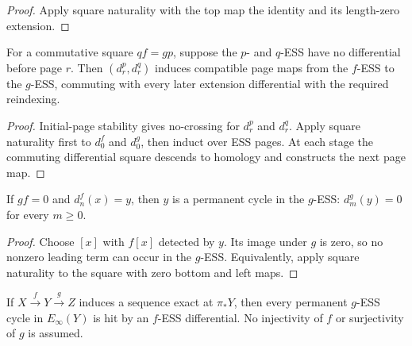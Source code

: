 \begin{proof}
  Apply square naturality with the top map the identity and its length-zero
  extension.
\end{proof}

\begin{corollary}
  \label{cor:fess-map-of-stable-pages}
  \notready
  For a commutative square $qf=gp$, suppose the $p$- and $q$-ESS have no
  differential before page $r$.  Then $(d_r^p,d_r^q)$ induces compatible page
  maps from the $f$-ESS to the $g$-ESS, commuting with every later extension
  differential with the required reindexing.
\end{corollary}

\begin{proof}
  Initial-page stability gives no-crossing for $d_r^p$ and $d_r^q$.  Apply
  square naturality first to $d_0^f$ and $d_0^g$, then induct over ESS pages.
  At each stage the commuting differential square descends to homology and
  constructs the next page map.
\end{proof}

\begin{corollary}
  \label{cor:fess-zero-composite-permanent}
  \notready
  If $gf=0$ and $d_n^f(x)=y$, then $y$ is a permanent cycle in the $g$-ESS:
  $d_m^g(y)=0$ for every $m\ge0$.
\end{corollary}

\begin{proof}
  Choose $[x]$ with $f[x]$ detected by $y$.  Its image under $g$ is zero, so
  no nonzero leading term can occur in the $g$-ESS.  Equivalently, apply square
  naturality to the square with zero bottom and left maps.
\end{proof}

\begin{proposition}
  \label{prop:fess-exact-middle-boundary}
  \notready
  If $X\xrightarrow fY\xrightarrow gZ$ induces a sequence exact at
  $\pi_*Y$, then every permanent $g$-ESS cycle in $E_\infty(Y)$ is hit by an
  $f$-ESS differential.  No injectivity of $f$ or surjectivity of $g$ is
  assumed.
\end{proposition}

